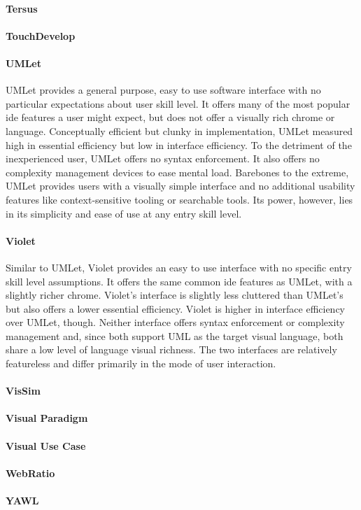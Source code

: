 \paragraph{Tersus}

\paragraph{TouchDevelop}

\paragraph{UMLet} UMLet provides a general purpose, easy to use software
interface with no particular expectations about user skill level. It offers
many of the most popular \ac{ide} features a user might expect, but does
not offer a visually rich chrome or language. Conceptually efficient but
clunky in implementation, UMLet measured high in essential efficiency but
low in interface efficiency. To the detriment of the inexperienced user,
UMLet offers no syntax enforcement. It also offers no complexity management
devices to ease mental load. Barebones to the extreme, UMLet provides users
with a visually simple interface and no additional usability features like
context-sensitive tooling or searchable tools. Its power, however, lies in
its simplicity and ease of use at any entry skill level.

\paragraph{Violet} Similar to UMLet, Violet provides an easy to use
interface with no specific entry skill level assumptions. It offers the
same common \ac{ide} features as UMLet, with a slightly richer chrome.
Violet's interface is slightly less cluttered than UMLet's but also offers
a lower essential efficiency. Violet is higher in interface efficiency over
UMLet, though. Neither interface offers syntax enforcement or complexity
management and, since both support UML as the target visual language, both
share a low level of language visual richness. The two interfaces are
relatively featureless and differ primarily in the mode of user
interaction.

\paragraph{VisSim}

\paragraph{Visual Paradigm}

\paragraph{Visual Use Case}

\paragraph{WebRatio}

\paragraph{YAWL}

